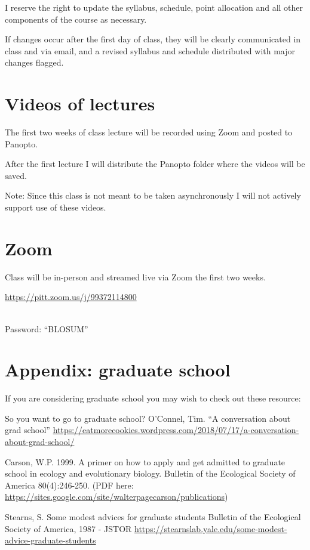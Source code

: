 \documentclass[
]{book}
\begin{document}
I reserve the right to update the syllabus, schedule, point allocation and all other components of the course as necessary.

If changes occur after the first day of class, they will be clearly communicated in class and via email, and a revised syllabus and schedule distributed with major changes flagged.

\hypertarget{videos-of-lectures}{%
\chapter{Videos of lectures}\label{videos-of-lectures}}

The first two weeks of class lecture will be recorded using Zoom and posted to Panopto.

After the first lecture I will distribute the Panopto folder where the videos will be saved.

Note: Since this class is not meant to be taken asynchronously I will not actively support use of these videos.

\hypertarget{zoom}{%
\chapter{Zoom}\label{zoom}}

Class will be in-person and streamed live via Zoom the first two weeks.

\url{https://pitt.zoom.us/j/99372114800}\strut \\
Password: ``BLOSUM''

\hypertarget{appendix-graduate-school}{%
\chapter{Appendix: graduate school}\label{appendix-graduate-school}}

If you are considering graduate school you may wish to check out these resource:

So you want to go to graduate school?
O'Connel, Tim. ``A conversation about grad school'' \url{https://eatmorecookies.wordpress.com/2018/07/17/a-conversation-about-grad-school/}

Carson, W.P. 1999. A primer on how to apply and get admitted to graduate school in ecology and evolutionary biology. Bulletin of the Ecological Society of America 80(4):246-250. (PDF here: \url{https://sites.google.com/site/walterpagecarson/publications})

Stearns, S. Some modest advices for graduate students
Bulletin of the Ecological Society of America, 1987 - JSTOR
\url{https://stearnslab.yale.edu/some-modest-advice-graduate-students}
\end{document}
